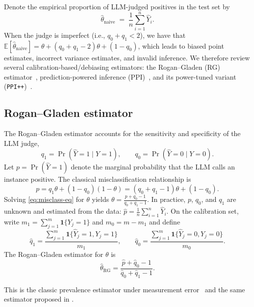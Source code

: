 \documentclass[11pt]{article}
\newcommand{\E}{\mathbb{E}}
\newcommand{\1}{\mathbf{1}}
\theoremstyle{remark}
\begin{document}
Denote the empirical proportion of LLM-judged positives in the test set by
\begin{equation}
\hat\theta_{\mathrm{naive}}
\;=\;
\frac{1}{n}\sum_{i=1}^n \widehat Y_i .
\label{eq:theta-naive}
\end{equation}
When the judge is imperfect (i.e., $q_0+q_1<2$), we have that $\E[\hat\theta_{\mathrm{naive}}]=\theta+(q_0 + q_1 - 2)\theta + (1 - q_0)$, which leads to biased point estimates, incorrect variance estimates, and invalid inference. We therefore review several calibration-based/debiasing estimators: the Rogan--Gladen (RG) estimator~\citep{rogan1978estimating,lee2025correctly}, prediction-powered inference (PPI)~\citep{angelopoulos2023prediction}, and its power-tuned variant (\texttt{PPI++})~\citep{angelopoulos2023ppipp}.


\subsection{Rogan--Gladen estimator}
\label{subsec:RG}

The Rogan--Gladen estimator accounts for the sensitivity and specificity of the LLM judge,
\begin{equation}
q_1 = \Pr(\hat Y = 1 \mid Y = 1),
\qquad
q_0 = \Pr(\hat Y = 0 \mid Y = 0).
\label{eq:q-param}
\end{equation}
Let $p = \Pr(\hat Y = 1)$ denote the marginal probability that the LLM calls an instance positive. The classical misclassification relationship is
\begin{equation}
p = q_1 \theta + (1-q_0)(1-\theta)
  = (q_0 + q_1 - 1)\theta + (1-q_0).
\label{eq:misclass-eq}
\end{equation}
Solving \eqref{eq:misclass-eq} for $\theta$ yields %
$\theta = \frac{p + q_0 - 1}{q_0 + q_1 - 1}.$
In practice, $p$, $q_0$, and $q_1$ are unknown and estimated from the data: $
\hat p = \frac{1}{n}\sum_{i=1}^n \hat Y_i$.
On the calibration set, write $m_1 = \sum_{j=1}^m \mathbf{1}\{Y_j=1\}$ and $m_0 = m - m_1$ and define
\[
\hat q_1 = 
\frac{\sum_{j=1}^m \mathbf{1}\{\hat Y_j=1,Y_j=1\}}{m_1},
\qquad
\hat q_0 = 
\frac{\sum_{j=1}^m \mathbf{1}\{\hat Y_j=0,Y_j=0\}}{m_0}.
\]
The Rogan--Gladen estimator for $\theta$ is
\begin{equation}
\hat\theta_{\mathrm{RG}} = \frac{\hat p + \hat q_0 - 1}{\hat q_0 + \hat q_1 - 1}.
\label{eq:theta-RG}
\end{equation}

This is the classic prevalence estimator under measurement error~\citep{rogan1978estimating,lang2014confidence} and the same estimator proposed in \citet{lee2025correctly}.
\end{document}
